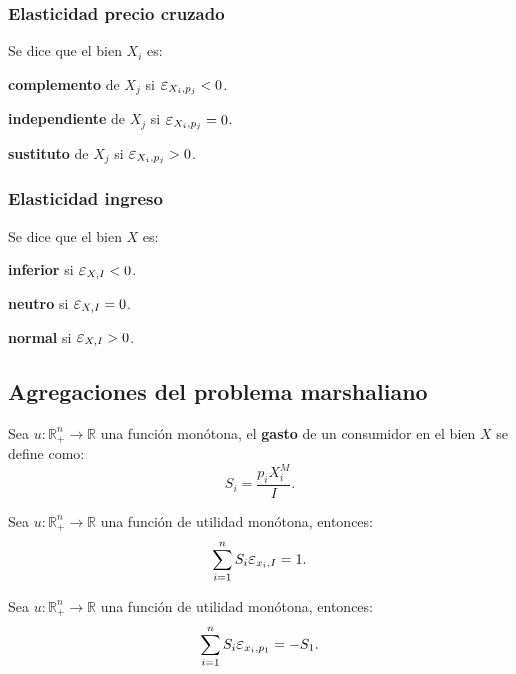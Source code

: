 \documentclass[8pt,a4paper]{extarticle}
\begin{document}
\begin{multicols}{3}
\subsubsection*{Elasticidad precio cruzado}

Se dice que el bien $X_i$ es:

\begin{eqlist}
\item \textbf{complemento} de $X_j$ si $\E_{X_i, p_j} < 0$.
\item \textbf{independiente} de $X_j$ si $\E_{X_i, p_j} = 0$.
\item \textbf{sustituto} de $X_j$ si $\E_{X_i, p_j} > 0$.
\end{eqlist}

\subsubsection*{Elasticidad ingreso}

Se dice que el bien $X$ es:

\begin{eqlist}
\item \textbf{inferior} si $\E_{X, I} < 0$.
\item \textbf{neutro} si $\E_{X, I} = 0$.
\item \textbf{normal} si $\E_{X, I} > 0$.
\end{eqlist}

\subsection{Agregaciones del problema marshaliano}

\begin{boxdef}
	Sea $u : \mathbb{R}^n_+ \to \mathbb{R}$ una función monótona, el \textbf{gasto} de un consumidor en el bien $X$ se define como:
	\[
	S_i = \frac{p_i X_i^M}{I}
	.\] 
\end{boxdef}

\begin{boxtheo}
	Sea $u : \mathbb{R}^n_+ \to \mathbb{R}$ una función de utilidad monótona, entonces:
	\[
		\sum_{i = 1}^{n} S_{{i}} \E_{x_i, I} = 1
	.\] 
\end{boxtheo}

\begin{boxtheo}
	Sea $u : \mathbb{R}^n_+ \to \mathbb{R}$ una función de utilidad monótona, entonces:
	\[
		\sum_{i = 1}^{n} S_{i} \E_{x_i, p_{1}} = - S_{1}
	.\] 
\end{boxtheo}


\end{multicols}
\end{document}
